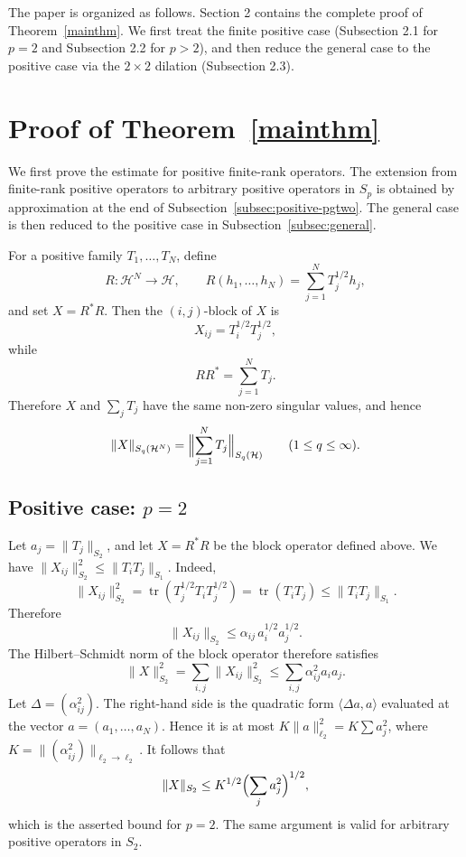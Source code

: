 \documentclass[10pt,a4paper]{amsart}
\newcommand{\1}{\mathbf{1}}
\DeclareMathOperator{\tr}{tr}
\begin{document}
The paper is organized as follows. Section 2 contains the complete proof of Theorem~\ref{mainthm}. We first treat the finite positive case (Subsection 2.1 for $p=2$ and Subsection 2.2 for $p>2$), and then reduce the general case to the positive case via the $2\times 2$ dilation (Subsection 2.3).

\section{Proof of Theorem~\ref{mainthm}}\label{compli}

We first prove the estimate for positive finite-rank operators. The extension
from finite-rank positive operators to arbitrary positive operators in $S_p$
is obtained by approximation at the end of Subsection~\ref{subsec:positive-pgtwo}.
The general case is then reduced to the positive
case in Subsection~\ref{subsec:general}.

For a positive family $T_1,\dots,T_N$, define
\[
R:\mathcal H^N\to\mathcal H,\qquad
R(h_1,\dots,h_N)=\sum_{j=1}^N T_j^{1/2}h_j,
\]
and set $X=R^*R$. Then the $(i,j)$-block of $X$ is
\[
X_{ij}=T_i^{1/2}T_j^{1/2},
\]
while
\[
RR^*=\sum_{j=1}^N T_j.
\]
Therefore $X$ and $\sum_j T_j$ have the same non-zero singular values, and hence
\[
\|X\|_{S_q(\mathcal H^N)}
=
\Bigl\|\sum_{j=1}^N T_j\Bigr\|_{S_q(\mathcal H)}
\qquad (1\le q\le \infty).
\]

\subsection{Positive case: $p=2$} 

Let $a_j=\|T_j\|_{S_2}$, and let $X=R^*R$ be the block operator defined above. 
We have  $\|X_{ij}\|_{S_2}^2\leq\|T_i T_j\|_{S_1}$. Indeed,
\[
\|X_{ij}\|_{S_2}^2
=\tr(T_j^{1/2}T_iT_j^{1/2})
=\tr(T_iT_j)
\le \|T_iT_j\|_{S_1}.
\]
Therefore
\[
\|X_{ij}\|_{S_2}\leq\alpha_{ij}\,a_i^{1/2}a_j^{1/2}.
\]
The Hilbert--Schmidt norm of the block operator therefore satisfies
\[
\|X\|_{S_2}^2=\sum_{i,j}\|X_{ij}\|_{S_2}^2\leq\sum_{i,j}\alpha_{ij}^2 a_i a_j.
\]
Let $\Delta=(\alpha_{ij}^2)$. The right-hand side is the quadratic form $\langle\Delta a,a\rangle$ evaluated at the vector $a=(a_1,\dots,a_N)$. Hence it is at most $K\|a\|_{\ell_2}^2=K\sum a_j^2$, where $K=\|(\alpha_{ij}^2)\|_{\ell_2\to\ell_2}$. It follows that
\[
\|X\|_{S_2}\leq K^{1/2}\Bigl(\sum_j a_j^2\Bigr)^{1/2},
\]
which is the asserted bound for $p=2$. The same argument is valid for
arbitrary positive operators in $S_2$. 
\end{document}
